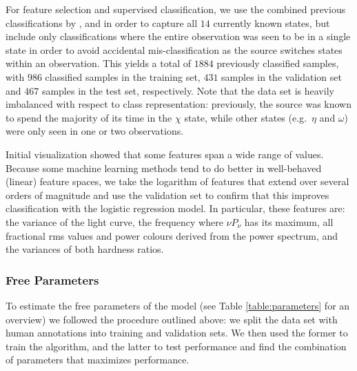 \documentclass[12pt]{emulateapj}
\begin{document}
For feature selection and supervised classification, we use the combined previous classifications by \citet{belloni2000}, \citet{kleinwolt2002} and \citet{hannikainen2003} in order to capture all $14$ currently known states, but include only classifications where the entire observation was seen to be in a single state in order to avoid accidental mis-classification as the source switches states within an observation. This yields a total of $1884$ previously classified samples, with $986$ classified samples in the training set, $431$ samples in the validation set and $467$ samples in the test set, respectively. Note that the data set is heavily imbalanced with respect to class representation: previously, the source was known to spend the majority of its time in the $\chi$ state, while other states (e.g.\ $\eta$ and $\omega$) were only seen in one or two observations. 

Initial visualization showed that some features span a wide range of values. Because some machine learning methods tend to do better in well-behaved (linear) feature spaces, we take the logarithm of features that extend over several orders of magnitude and use the validation set to confirm that this improves classification with the logistic regression model. In particular, these features are: the variance of the light curve, the frequency where $\nu P_\nu$ has its maximum, all fractional rms values and power colours derived from the power spectrum, and the variances of both hardness ratios. 

\subsubsection{Free Parameters}
\label{sec:freeparams}

To estimate the free parameters of the model (see Table \ref{table:parameters} for an overview) we followed the procedure outlined above: we split the data set with human annotations into training and validation sets. We then used the former to train the algorithm, and the latter to test performance and find the combination of parameters that maximizes performance.
\end{document}

